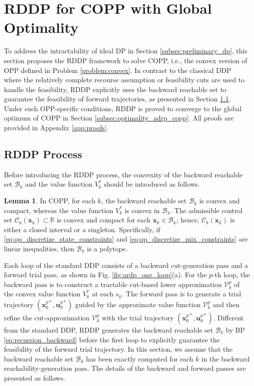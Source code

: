 \documentclass[journal]{IEEEtran}
\theoremstyle{definition}
\newtheorem{lemma}{Lemma}
\theoremstyle{definition}
\newcommand\R{{\mathbb{R}}}
\renewcommand\vector[1]{\boldsymbol{#1}}
\newcommand\vx{{\vector{x}}}
\newcommand\bx{{\mathbf{x}}}
\newcommand\bu{{\mathbf{u}}}
\begin{document}
\section{RDDP for COPP with Global Optimality}\label{sec:RDDP_COPP}

To address the intractability of ideal DP in Section \ref{subsec:preliminary_dp}, this section proposes the RDDP framework to solve COPP, i.e., the convex version of OPP defined in Problem \ref{problem:convex}. In contrast to the classical DDP where the relatively complete recourse assumption or feasibility cuts are used to handle the feasibility, RDDP explicitly uses the backward reachable set to guarantee the feasibility of forward trajectories, as presented in Section \ref{subsec:rddp_process}. Under such OPP-specific conditions, RDDP is proved to converge to the global optimum of COPP in Section \ref{subsec:optimality_adrp_copp}. All proofs are provided in Appendix \ref{app:proofs}. 

\subsection{RDDP Process}\label{subsec:rddp_process}

Before introducing the RDDP process, the convexity of the backward reachable set $\mathcal{B}_k$ and the value function $V_k^*$ should be introduced as follows.
\begin{lemma}\label{lemma:convexity_reachset_valfunc}
    In COPP, for each $k$, the backward reachable set $\mathcal{B}_k$ is convex and compact, whereas the value function $V_k^*$ is convex in $\mathcal{B}_k$. The admissible control set $\mathcal{C}_k(\vx_k)\subset\R$ is convex and compact for each $\vx_k\in\mathcal{B}_k$; hence, $\mathcal{C}_k(\vx_k)$ is either a closed interval or a singleton. Specifically, if \eqref{eq:op_discretize_state_constraints} and \eqref{eq:op_discretize_mix_constraints} are linear inequalities, then $\mathcal{B}_k$ is a polytope.
\end{lemma}

Each loop of the standard DDP consists of a backward cut-generation pass and a forward trial pass, as shown in Fig. \ref{fig:ardp_one_loop}(a). For the $p$-th loop, the backward pass is to construct a tractable cut-based lower approximation $\mathcal{V}_k^p$ of the convex value function $V_k^*$ at each $s_k$. The forward pass is to generate a trial trajectory $(\bx_0^{p*}, \bu_0^{p*})$ guided by the approximate value function $\mathcal{V}_k^p$ and then refine the cut-approximation $\mathcal{V}_k^p$ with the trial trajectory $(\bx_0^{p*}, \bu_0^{p*})$. Different from the standard DDP, RDDP generates the backward reachable set $\mathcal{B}_k$ by BP \eqref{eq:recursion_backward} before the first loop to explicitly guarantee the feasibility of the forward trial trajectory. In this section, we assume that the backward reachable set $\mathcal{B}_k$ has been exactly computed for each $k$ in the backward reachability-generation pass. The details of the backward and forward passes are presented as follows.
\end{document}
